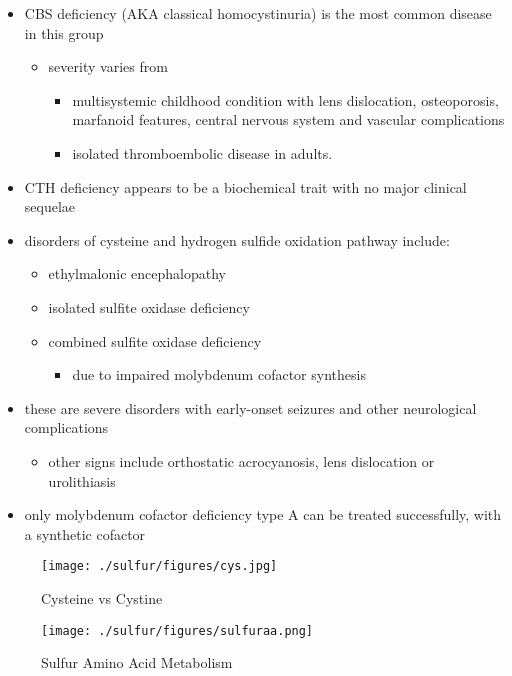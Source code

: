 \documentclass{scrartcl}
\begin{document}
\begin{itemize}
\item CBS deficiency (AKA classical homocystinuria) is the most common
disease in this group
\begin{itemize}
\item severity varies from
\begin{itemize}
\item multisystemic childhood condition with lens dislocation,
osteoporosis, marfanoid features, central nervous system and
vascular complications
\item isolated thromboembolic disease in adults.
\end{itemize}
\end{itemize}
\item CTH deficiency appears to be a biochemical trait with no major
clinical sequelae
\item disorders of cysteine and hydrogen sulfide oxidation pathway include:
\begin{itemize}
\item ethylmalonic encephalopathy
\item isolated sulfite oxidase deficiency
\item combined sulfite oxidase deficiency
\begin{itemize}
\item due to impaired molybdenum cofactor synthesis
\end{itemize}
\end{itemize}
\item these are severe disorders with early-onset seizures and other
neurological complications
\begin{itemize}
\item other signs include orthostatic acrocyanosis, lens dislocation or
urolithiasis
\end{itemize}
\item only molybdenum cofactor deficiency type A can be treated
successfully, with a synthetic cofactor
\end{itemize}

\begin{figure}[htbp]
\centering
\texttt{[image: ./sulfur/figures/cys.jpg]}
\caption{\label{fig:org521b3e6}
Cysteine vs Cystine}
\end{figure}

\begin{figure}[htbp]
\centering
\texttt{[image: ./sulfur/figures/sulfuraa.png]}
\caption{\label{fig:org70525a2}
Sulfur Amino Acid Metabolism}
\end{figure}
\end{document}
